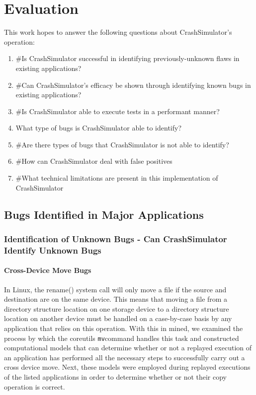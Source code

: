 \section{Evaluation}

    This work hopes to answer the following questions about CrashSimulator's operation:

        \begin{enumerate}
            \item{#Is CrashSimulator successful in identifying previously-unknown flaws in existing applications?}
            \item{#Can CrashSimulator's efficacy be shown through identifying known bugs in existing applications?}
            \item{#Is CrashSimulator able to execute tests in a performant manner?}
            \item{What type of bugs is CrashSimulator able to identify?}
            \item{#Are there types of bugs that CrashSimulator is not able to identify?}
            \item{#How can CrashSimulator deal with false positives}
            \item{#What technical limitations are present in this implementation of CrashSimulator}
        \end{enumerate}

    \subsection{Bugs Identified in Major Applications}

        \subsubsection{Identification of Unknown Bugs - Can CrashSimulator Identify Unknown Bugs}

        \paragraph{Cross-Device Move Bugs}

        In Linux, the rename() system call will only move a file if the source and destination are on the same device.
        This means that moving a file from a directory structure location on one storage device to a directory structure location on
        another device must be handled on a case-by-case basis by any application that relies on this operation.  With
        this in mined, we examined the process by which the coreutils {\tt mv}command handles this task and constructed
        computational models that can determine whether or not a replayed execution of an application has performed all
        the necessary steps to successfully carry out a cross device move.  Next, these models were employed during
        replayed executions of the listed applications in order to determine whether or not their copy operation is correct.

